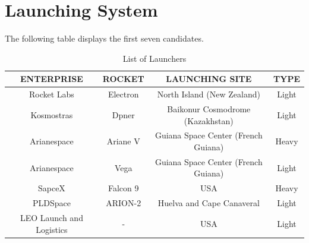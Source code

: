 \section{Launching System}
The following table displays the first seven candidates. 
\newline	
	\begin{table}[h]
	\begin{center}
	\begin{tabular}{|c|c|c|c|}
	\hline
	\bf{ENTERPRISE} & \bf{ROCKET} & \bf{LAUNCHING SITE} & \bf{TYPE}  \\
	\hline 
	Rocket Labs & Electron & North Island (New Zealand) & Light \\
	\hline 
	Kosmostras & Dpner & Baikonur Cosmodrome (Kazakhstan) & Light\\
	\hline 
	Arianespace & Ariane V & Guiana Space Center (French Guiana) & Heavy \\
	\hline
	 Arianespace & Vega & Guiana Space Center (French Guiana) & Light\\
	\hline 
	SapceX & Falcon 9 & USA & Heavy \\
	\hline 
	PLDSpace & ARION-2 & Huelva and Cape Canaveral & Light\\
	\hline 
	LEO Launch and Logistics & - & USA & Light \\
	\hline
	\end{tabular}
	\end{center}
	\caption{List of Launchers}
	\end{table} 
\newline
